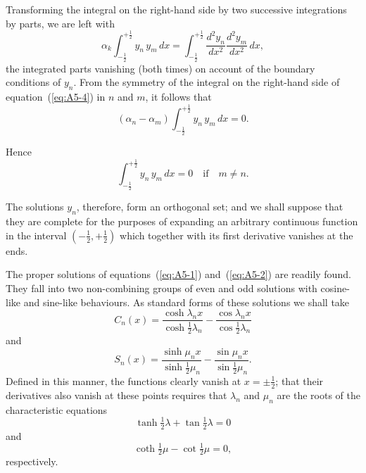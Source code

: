 Transforming the integral on the right-hand side by two successive
integrations by parts, we are left with
\begin{equation}
\label{eq:A5-4}
\alpha_k \int_{-\frac{1}{2}}^{+\frac{1}{2}} y_n \, y_m \, dx = \int_{-\frac{1}{2}}^{+\frac{1}{2}} \frac{d^2 y_n}{dx^2} \frac{d^2 y_m}{dx^2} \, dx,
\end{equation}
the integrated parts vanishing (both times) on account of the boundary
conditions of $y_n$. From the symmetry of the integral on the right-hand
side of equation~(\ref{eq:A5-4}) in $n$ and $m$, it follows that
\begin{equation}
\label{eq:A5-5}
(\alpha_n - \alpha_m) \int_{-\frac{1}{2}}^{+\frac{1}{2}} y_n \, y_m \, dx = 0.
\end{equation}

Hence
\begin{equation}
\label{eq:A5-6}
\int_{-\frac{1}{2}}^{+\frac{1}{2}} y_n \, y_m \, dx = 0 \quad \text{if} \quad m \neq n.
\end{equation}

The solutions $y_n$, therefore, form an orthogonal set; and we shall suppose
that they are complete for the purposes of expanding an arbitrary
continuous function in the interval $(-\frac{1}{2}, +\frac{1}{2})$ which together with its
first derivative vanishes at the ends.

The proper solutions of equations~(\ref{eq:A5-1}) and~(\ref{eq:A5-2}) are readily found. They
fall into two non-combining groups of even and odd solutions with
cosine-like and sine-like behaviours. As standard forms of these solutions we shall take
\begin{equation}
\label{eq:A5-7}
C_n(x) = \frac{\cosh \lambda_n x}{\cosh \frac{1}{2}\lambda_n} - \frac{\cos \lambda_n x}{\cos \frac{1}{2}\lambda_n}
\end{equation}
and
\begin{equation}
\label{eq:A5-8}
S_n(x) = \frac{\sinh \mu_n x}{\sinh \frac{1}{2}\mu_n} - \frac{\sin \mu_n x}{\sin \frac{1}{2}\mu_n}.
\end{equation}
Defined in this manner, the functions clearly vanish at $x = \pm \frac{1}{2}$; that
their derivatives also vanish at these points requires that $\lambda_n$ and $\mu_n$
are the roots of the characteristic equations
\begin{equation}
\label{eq:A5-9}
\tanh \tfrac{1}{2}\lambda + \tan \tfrac{1}{2}\lambda = 0
\end{equation}
and
\begin{equation}
\label{eq:A5-10}
\coth \tfrac{1}{2}\mu - \cot \tfrac{1}{2}\mu = 0,
\end{equation}
respectively.

